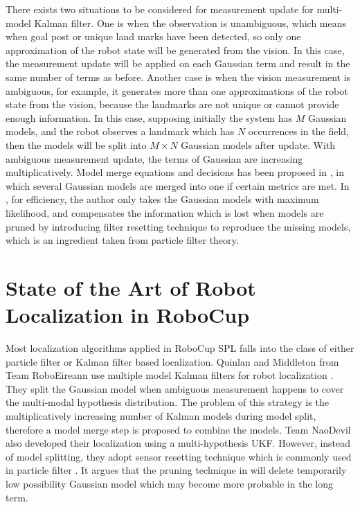 There exists two situations to be considered for measurement update for multi-model Kalman filter. One is when the observation is unambiguous, which means when goal post or unique land marks have been detected, so only one approximation of the robot state will be generated from the vision. In this case, the measurement update will be applied on each Gaussian term and result in the same number of terms as before. Another case is when the vision measurement is ambiguous, for example, it generates more than one approximations of the robot state from the vision, because the landmarks are not unique or cannot provide enough information. In this case, supposing initially the system has $M$ Gaussian models, and the robot observes a landmark which has $N$ occurrences in the field, then the models will be split into $M \times N$ Gaussian models after update. With ambiguous measurement update, the terms of Gaussian are increasing multiplicatively. Model merge equations and decisions has been proposed in \cite{Quinlan2010}, in which several Gaussian models are merged into one if certain metrics are met. In \cite{Jochmann2012}, for efficiency, the author only takes the Gaussian models with maximum likelihood, and compensates the information which is lost when models are pruned by introducing filter resetting technique to reproduce the missing models, which is an ingredient taken from particle filter theory.

\section{State of the Art of Robot Localization in RoboCup}\label{sec:2.2}
Most localization algorithms applied in RoboCup \gls{SPL} falls into the class of either particle filter or Kalman filter based localization. Quinlan and Middleton from Team RoboEireann use multiple model Kalman filters for robot localization \cite{Quinlan2010}. They split the Gaussian model when ambiguous measurement happens to cover the multi-modal hypothesis distribution. The problem of this strategy is the multiplicatively increasing number of Kalman models during model split, therefore a model merge step is proposed to combine the models. Team NaoDevil also developed their localization using a multi-hypothesis \gls{UKF}. However, instead of model splitting, they adopt sensor resetting technique which is commonly used in particle filter \cite{Jochmann2012}. It argues that the  pruning technique in \cite{Quinlan2010} will delete temporarily low possibility Gaussian model which may become more probable in the long term.

